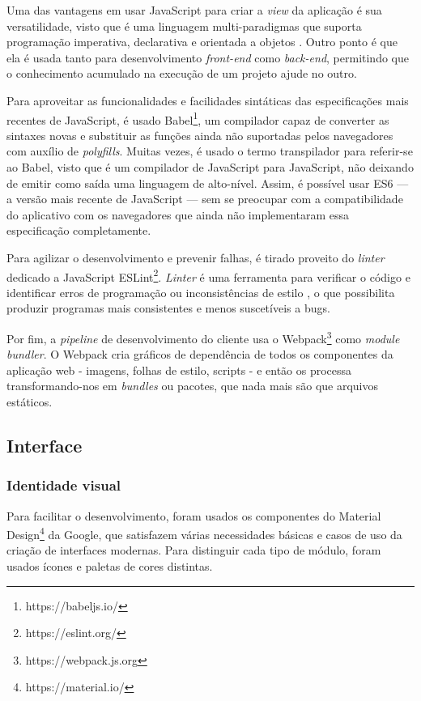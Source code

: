 Uma das vantagens em usar JavaScript para criar a \emph{view} da aplicação é sua versatilidade, visto que é uma linguagem multi-paradigmas que suporta programação imperativa, declarativa e orientada a objetos \cite{mdnjs}. Outro ponto é que ela é usada tanto para desenvolvimento \emph{front-end} como \emph{back-end}, permitindo que o conhecimento acumulado na execução de um projeto ajude no outro.

Para aproveitar as funcionalidades e facilidades sintáticas das especificações mais recentes de JavaScript, é usado Babel\footnote{https://babeljs.io/}, um compilador capaz de converter as sintaxes novas e substituir as funções ainda não suportadas pelos navegadores com auxílio de \textit{polyfills}. Muitas vezes, é usado o termo transpilador para referir-se ao Babel, visto que é um compilador de JavaScript para JavaScript, não deixando de emitir como saída uma linguagem de alto-nível. Assim, é possível usar ES6 --- a versão mais recente de JavaScript --- sem se preocupar com a compatibilidade do aplicativo com os navegadores que ainda não implementaram essa especificação completamente.

Para agilizar o desenvolvimento e prevenir falhas, é tirado proveito do \textit{linter} dedicado a JavaScript ESLint\footnote{https://eslint.org/}. \textit{Linter} é uma ferramenta para verificar o código e identificar erros de programação ou inconsistências de estilo \cite{linter}, o que possibilita produzir programas mais consistentes e menos suscetíveis a bugs.

Por fim, a \emph{pipeline} de desenvolvimento do cliente usa o Webpack\footnote{https://webpack.js.org} como \textit{module bundler}. O Webpack cria gráficos de dependência de todos os componentes da aplicação web - imagens, folhas de estilo, scripts - e então os processa transformando-nos em \textit{bundles} ou pacotes, que nada mais são que arquivos estáticos.

\subsection{Interface}

\subsubsection{Identidade visual}

Para facilitar o desenvolvimento, foram usados os componentes do Material Design\footnote{https://material.io/} da Google, que satisfazem várias necessidades básicas e casos de uso da criação de interfaces modernas. Para distinguir cada tipo de módulo, foram usados ícones e paletas de cores distintas.

